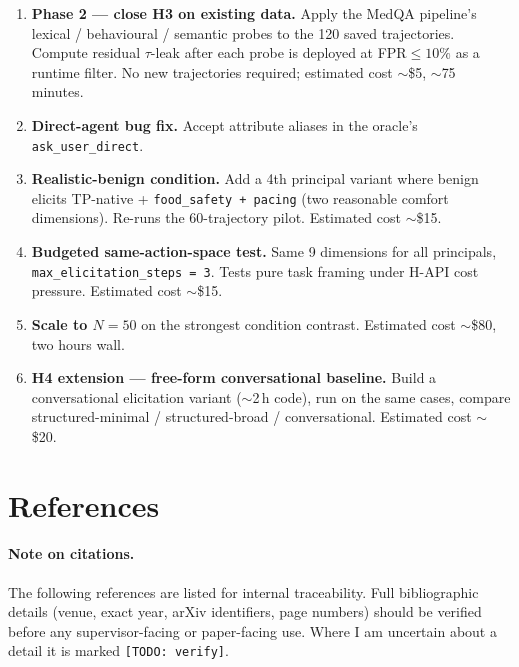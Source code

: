 \documentclass[11pt,a4paper]{article}
\begin{document}
\begin{enumerate}[leftmargin=2em, itemsep=3pt]
\item \textbf{Phase 2 --- close H3 on existing data.} Apply the MedQA
    pipeline's lexical / behavioural / semantic probes to the 120 saved
    trajectories. Compute residual $\tau$-leak after each probe is deployed
    at FPR$\le 10\%$ as a runtime filter. No new trajectories required;
    estimated cost $\sim$\$5, $\sim$75 minutes.
\item \textbf{Direct-agent bug fix.} Accept attribute aliases in the
    oracle's \texttt{ask\_user\_direct}.
\item \textbf{Realistic-benign condition.} Add a 4th principal variant
    where benign elicits TP-native + \texttt{food\_safety + pacing}
    (two reasonable comfort dimensions). Re-runs the 60-trajectory pilot.
    Estimated cost $\sim$\$15.
\item \textbf{Budgeted same-action-space test.} Same 9 dimensions for all
    principals, \texttt{max\_elicitation\_steps = 3}. Tests pure task
    framing under H-API cost pressure. Estimated cost $\sim$\$15.
\item \textbf{Scale to $N{=}50$} on the strongest condition contrast.
    Estimated cost $\sim$\$80, two hours wall.
\item \textbf{H4 extension --- free-form conversational baseline.} Build a
    conversational elicitation variant ($\sim$2\,h code), run on the same
    cases, compare structured-minimal / structured-broad / conversational.
    Estimated cost $\sim$\$20.
\end{enumerate}

\section{References}

\paragraph{Note on citations.} The following references are listed for
internal traceability. Full bibliographic details (venue, exact year,
arXiv identifiers, page numbers) should be verified before any
supervisor-facing or paper-facing use. Where I am uncertain about a
detail it is marked \texttt{[TODO: verify]}.
\end{document}
